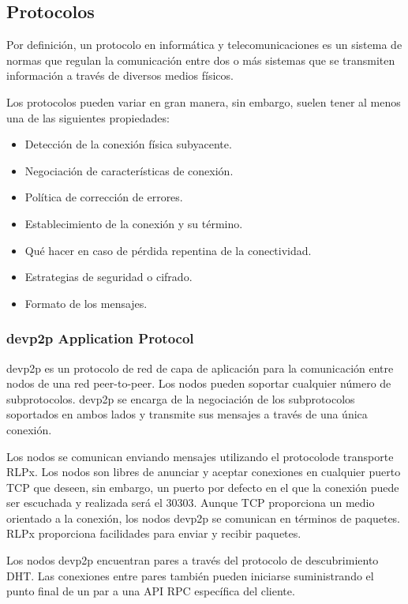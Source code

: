 \subsection{Protocolos}
Por definición, un protocolo en informática y telecomunicaciones es un sistema de normas que
regulan la comunicación entre dos o más sistemas que se transmiten información a través de 
diversos medios físicos.

Los protocolos pueden variar en gran manera, sin embargo, suelen tener al menos una de las 
siguientes propiedades:

\begin{itemize}
\item Detección de la conexión física subyacente.
\item Negociación de características de conexión.
\item Política de corrección de errores.
\item Establecimiento de la conexión y su término.
\item Qué hacer en caso de pérdida repentina de la conectividad.
\item Estrategias de seguridad o cifrado.
\item Formato de los mensajes.
\end{itemize}


\subsubsection{devp2p Application Protocol}
devp2p es un protocolo de red de capa de aplicación para la comunicación entre nodos de una red
peer-to-peer. Los nodos pueden soportar cualquier número de subprotocolos. devp2p se encarga de la
negociación de los subprotocolos soportados en ambos lados y transmite sus mensajes a través de una
única conexión.

Los nodos se comunican enviando mensajes utilizando el protocolode transporte RLPx. Los nodos son
libres de anunciar y aceptar conexiones en cualquier puerto TCP que deseen, sin embargo, un puerto
por defecto en el que la conexión puede ser escuchada y realizada será el 30303. Aunque TCP
proporciona un medio orientado a la conexión, los nodos devp2p se comunican en términos de
paquetes. RLPx proporciona facilidades para enviar y recibir paquetes. 

Los nodos devp2p encuentran pares a través del protocolo de descubrimiento DHT. Las conexiones
entre pares también pueden iniciarse suministrando el punto final de un par a una API RPC
específica del cliente.


